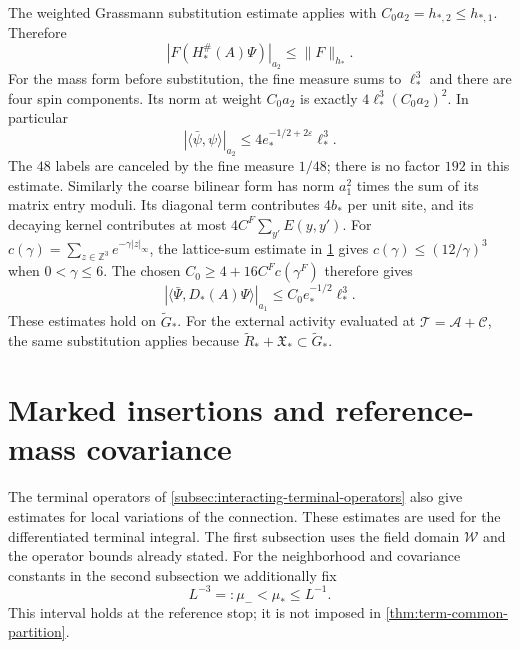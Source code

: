\documentclass[11pt,letterpaper,reqno]{amsart}
\newcommand{\Z}{\mathbb Z}
\begin{document}
The weighted Grassmann substitution estimate
applies with $C_0a_2=h_{*,2}\le h_{*,1}$.
Therefore
\begin{equation}\label{eq:interacting-terminal-substitution}
 |F(H_*^\#(A)\Psi)|_{a_2}\le\|F\|_{h_*}.
\end{equation}
For the mass form before substitution, the
fine measure sums to $\ell_*^3$ and there
are four spin components. Its norm at
weight $C_0a_2$ is exactly
$4\ell_*^3(C_0a_2)^2$. In particular
\begin{equation}\label{eq:interacting-terminal-mass-form}
 |\langle\bar\psi,\psi\rangle|_{a_2}
                   \le4e_*^{-1/2+2\varepsilon}\ell_*^3.
\end{equation}
The $48$ labels are canceled by the fine
measure $1/48$; there is no factor $192$
in this estimate. Similarly the coarse
bilinear form has norm $a_1^2$ times the
sum of its matrix entry moduli. Its diagonal
term contributes $4b_*$ per unit site,
and its decaying kernel contributes at
most $4C^F\sum_{y'}E(y,y')$.
For $c(\gamma)=\sum_{z\in\Z^3}e^{-\gamma|z|_\infty}$,
the lattice-sum estimate in \cref{sec:tpm-marked} gives
$c(\gamma)\le(12/\gamma)^3$ when $0<\gamma\le6$.
The chosen $C_0\ge4+16C^Fc(\gamma^F)$ therefore gives
\begin{equation}\label{eq:interacting-terminal-Dirac-form}
 |\langle\bar\Psi,D_*(A)\Psi\rangle|_{a_1}
                                  \le C_0e_*^{-1/2}\ell_*^3.
\end{equation}
These estimates hold on $\widetilde G_*$.
For the external activity evaluated at
$\mathscr T=\mathscr A+\mathscr C$, the
same substitution applies because
$\widetilde R_*+\mathfrak X_*\subset\widetilde G_*$.


\appendix
\section{Marked insertions and reference-mass covariance}
\label{sec:tpm-marked}

The terminal operators of \cref{subsec:interacting-terminal-operators}
also give estimates for local variations of the connection.
These estimates are used for the differentiated terminal integral.
The first subsection uses the field domain $\mathcal W$ and
the operator bounds already stated. For the neighborhood and
covariance constants in the second subsection we additionally fix
\[
                    L^{-3}=:\mu_-<\mu_*\le L^{-1}.
\]
This interval holds at the reference stop; it is not imposed
in \cref{thm:term-common-partition}.
\end{document}
